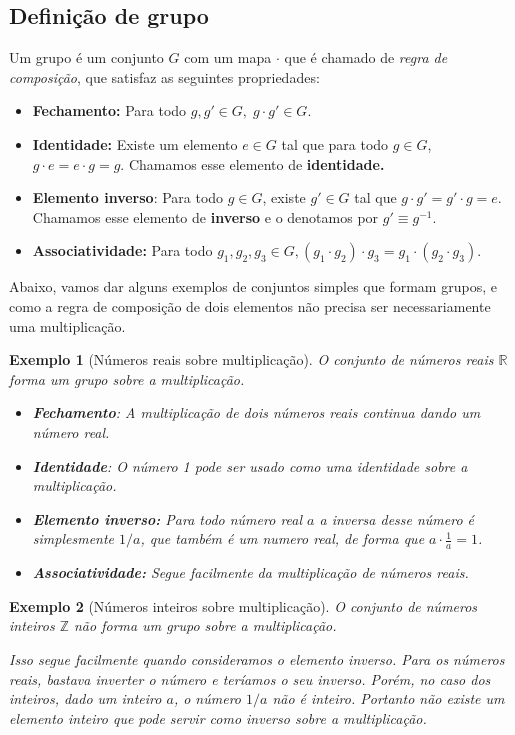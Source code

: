 \documentclass{article}
\newtheorem{example}{Exemplo}[section]
\numberwithin{equation}{section}
\numberwithin{figure}{section}
\begin{document}
\subsection{Definição de grupo}
Um grupo é um conjunto $G$ com um mapa $\cdot$ que é chamado de \textit{regra de composição}, que satisfaz as seguintes propriedades:  
\begin{itemize}
	\item \textbf{Fechamento:} Para todo $g,g'\in G,\; g\cdot g'\in G.$ 
	\item \textbf{Identidade:} Existe um elemento $e\in G$ tal que para todo $g\in G$, $g\cdot e=e\cdot g = g$. Chamamos esse elemento de \textbf{identidade. }
	\item \textbf{Elemento inverso}: Para todo $g\in G$, existe $g'\in G$ tal que $g\cdot g'=g'\cdot g = e$. Chamamos esse elemento de\textbf{ inverso} e o denotamos por $g'\equiv g^{-1}$. 
	\item \textbf{Associatividade:} Para todo $g_1,g_2,g_3\in G,(g_1\cdot g_2)\cdot g_3=g_1\cdot(g_2\cdot g_3).$
\end{itemize}
Abaixo, vamos dar alguns exemplos de conjuntos simples que formam grupos, e como a regra de composição de dois elementos não precisa ser necessariamente uma multiplicação. 
\begin{example}[Números reais sobre multiplicação]
	O conjunto de números reais $\mathbb{R}$ forma um grupo sobre a multiplicação. 
	\begin{itemize}
		\item \textbf{Fechamento}: A multiplicação de dois números reais continua dando um número real. 
		\item  \textbf{Identidade}: O número 1 pode ser usado como uma identidade sobre a multiplicação. 
		\item \textbf{Elemento inverso:} Para todo número real $a$ a inversa desse número é simplesmente $1/a$, que também é um numero real, de forma que $a\cdot\frac{1}{a}=1$. 
		\item \textbf{Associatividade:} Segue facilmente da multiplicação de números reais.
	\end{itemize}
\end{example}
\begin{example}[Números inteiros sobre multiplicação]
O conjunto de números inteiros $\mathbb{Z}$ não forma um grupo sobre a multiplicação.

Isso segue facilmente quando consideramos o elemento inverso. Para os números reais, bastava inverter o número e teríamos o seu inverso. Porém, no caso dos inteiros, dado um inteiro $a$, o número $1/a$ não é inteiro. Portanto não existe um elemento inteiro que pode servir como inverso sobre a multiplicação.
\end{example}
\end{document}
